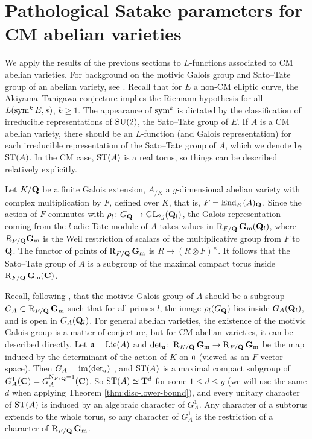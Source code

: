 \section{Pathological Satake parameters for CM abelian varieties}
\label{sec:Satake-CM}

We apply the results of the previous sections to $L$-functions associated to 
CM abelian varieties. For background on the motivic Galois group and Sato--Tate 
group of an abelian variety, see \cite{serre-tate-1968,serre-1994,yu-2015}. 
Recall that for $E$ a non-CM elliptic curve, the 
Akiyama--Tanigawa conjecture implies the Riemann hypothesis for all 
$L(\operatorname{sym}^k E,s)$, $k\geqslant 1$. The appearance of $\operatorname{sym}^k$ is dictated by the 
classification of irreducible representations of $\operatorname{SU}(2)$, the Sato--Tate group 
of $E$. If $A$ is a CM abelian variety, there should be an $L$-function (and 
Galois representation) for each irreducible representation of the Sato--Tate 
group of $A$, which we denote by $\mathrm{ST}(A)$. In the 
CM case, $\mathrm{ST}(A)$ is a real torus, so things can be described relatively 
explicitly. 

Let $K/\mathbf{Q}$ be a finite Galois extension, $A_{/K}$ a $g$-dimensional abelian 
variety with complex multiplication by $F$, defined over $K$, that is, 
$F = \operatorname{End}_K(A)_{\mathbf{Q}}$. Since the action of $F$ commutes with 
$\rho_l\colon G_{\mathbf{Q}} \to \operatorname{GL}_{2g}(\mathbf{Q}_l)$, the Galois representation coming 
from the $l$-adic Tate module of $A$ takes values in $\operatorname{R}_{F/\mathbf{Q}}\mathbf{G}_\mathrm{m}(\mathbf{Q}_l)$, 
where $R_{F/\mathbf{Q}} \mathbf{G}_\mathrm{m}$ is the Weil restriction of scalars of the multiplicative 
group from $F$ to $\mathbf{Q}$. The functor of points of $\operatorname{R}_{F/\mathbf{Q}}\mathbf{G}_\mathrm{m}$ is 
$R\mapsto (R\otimes F)^\times$. It follows that the Sato--Tate group of $A$ is 
a subgroup of the maximal compact torus inside $\operatorname{R}_{F/\mathbf{Q}}\mathbf{G}_\mathrm{m}(\mathbf{C})$. 

Recall, following \cite{serre-1994}, that the motivic Galois group of $A$ 
should be a subgroup $G_A\subset \operatorname{R}_{F/\mathbf{Q}}\mathbf{G}_\mathrm{m}$ such that for all primes $l$, 
the image $\rho_l(G_{\mathbf{Q}})$ lies inside $G_A(\mathbf{Q}_l)$, and is open in 
$G_A(\mathbf{Q}_l)$. For general abelian varieties, the existence of the motivic 
Galois group is a matter of conjecture, but for CM abelian varieties, it can be 
described directly. Let $\mathfrak{a}=\operatorname{Lie}(A)$ and 
$\det_{\mathfrak{a}}\colon \operatorname{R}_{K/\mathbf{Q}}\mathbf{G}_\mathrm{m} \to \operatorname{R}_{F/\mathbf{Q}}\mathbf{G}_\mathrm{m}$ be the map induced by the 
determinant of the action of $K$ on $\mathfrak{a}$ (viewed as an $F$-vector space). Then 
$G_A = \operatorname{im}(\det_{\mathfrak{a}})$ \cite{yu-2015}, and $\mathrm{ST}(A)$ is a maximal compact 
subgroup of $G_A^1(\mathbf{C}) = G_A^{\operatorname{N}_{F/\mathbf{Q}} = 1}(\mathbf{C})$. So 
$\mathrm{ST}(A) \simeq \mathbf{T}^d$ for some $1\leqslant d \leqslant g$ (we will use the 
same $d$ when applying Theorem \ref{thm:disc-lower-bound}), and every 
unitary character of $\mathrm{ST}(A)$ is induced by an algebraic character of 
$G_A^1$. Any character of a subtorus extends to the whole torus, so any 
character of $G_A^1$ is the restriction of a character of $\operatorname{R}_{F/\mathbf{Q}}\mathbf{G}_\mathrm{m}$. 

